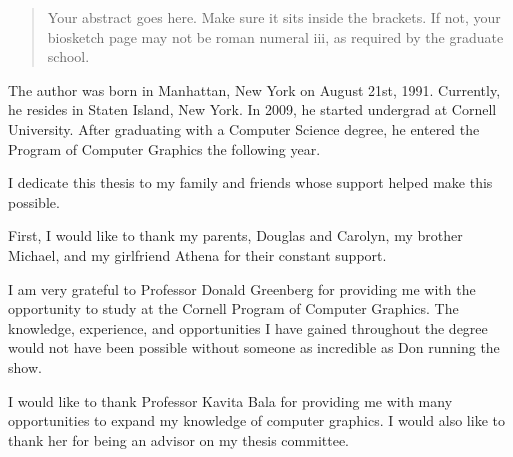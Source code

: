 \begin{abstract}
Your abstract goes here. Make sure it sits inside the brackets. If not,
your biosketch page may not be roman numeral iii, as required by the
graduate school.
\end{abstract}

\begin{biosketch}
The author was born in Manhattan, New York on August 21st, 1991. Currently, he resides in Staten Island, New York. In 2009, he started undergrad at Cornell University. After graduating with a Computer Science degree, he entered the Program of Computer Graphics the following year.
\end{biosketch}

\begin{dedication}
I dedicate this thesis to my family and friends whose support helped make this possible.
\end{dedication}

\begin{acknowledgements}
First, I would like to thank my parents, Douglas and Carolyn, my brother Michael, and my girlfriend Athena for their constant support.

I am very grateful to Professor Donald Greenberg for providing me with the opportunity to study at the Cornell Program of Computer Graphics. The knowledge, experience, and opportunities I have gained throughout the degree would not have been possible without someone as incredible as Don running the show.

I would like to thank Professor Kavita Bala for providing me with many opportunities to expand my knowledge of computer graphics. I would also like to thank her for being an advisor on my thesis committee.
\end{acknowledgements}
